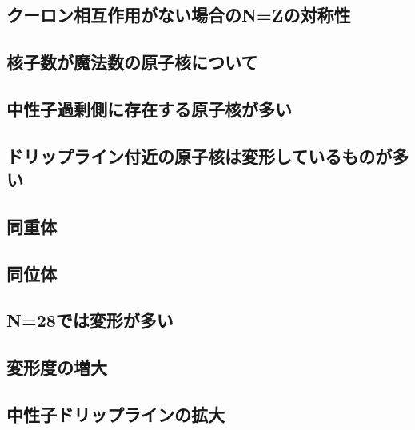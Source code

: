 \documentclass[12pt]{jarticle}
\begin{document}
\subsection{クーロン相互作用がない場合のN=Zの対称性}
\subsection{核子数が魔法数の原子核について}
\subsection{中性子過剰側に存在する原子核が多い}
\subsection{ドリップライン付近の原子核は変形しているものが多い}
\subsection{同重体}
\subsection{同位体}
\subsection{N=28では変形が多い}
\subsection{変形度の増大}
\subsection{中性子ドリップラインの拡大}
\end{document}
